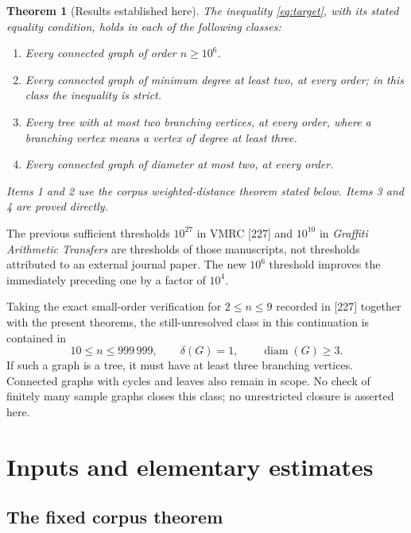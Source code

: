 \documentclass[11pt,a4paper]{article}
\newtheorem{theorem}{Theorem}[section]
\theoremstyle{remark}\newtheorem{remark}[theorem]{Remark}
\DeclareMathOperator{\diam}{diam}
\begin{document}
\begin{theorem}[Results established here]\label{thm:summary}
The inequality \eqref{eq:target}, with its stated equality condition,
holds in each of the following classes:
\begin{enumerate}
\item Every connected graph of order $n\ge10^6$.
\item Every connected graph of minimum degree at least two, at every order;
in this class the inequality is strict.
\item Every tree with at most two branching vertices, at every order,
where a branching vertex means a vertex of degree at least three.
\item Every connected graph of diameter at most two, at every order.
\end{enumerate}
Items 1 and 2 use the corpus weighted-distance theorem stated below.
Items 3 and 4 are proved directly.
\end{theorem}

The previous sufficient thresholds $10^{27}$ in VMRC [227] \cite{vmrc227}
and $10^{10}$ in \emph{Graffiti Arithmetic Transfers} \cite{transfers}
are thresholds of those manuscripts, not thresholds attributed to an
external journal paper. The new $10^6$ threshold improves the immediately
preceding one by a factor of $10^4$.

Taking the exact small-order verification for $2\le n\le9$ recorded in
[227] together with the present theorems, the still-unresolved class in
this continuation is contained in
\begin{equation}\label{eq:remaining}
 10\le n\le999\,999,\qquad \delta(G)=1,\qquad \diam(G)\ge3.
\end{equation}
If such a graph is a tree, it must have at least three branching vertices.
Connected graphs with cycles and leaves also remain in scope. No check
of finitely many sample graphs closes this class; no unrestricted closure
is asserted here.

\section{Inputs and elementary estimates}
\label{sec:inputs}

\subsection{The fixed corpus theorem}
\end{document}
